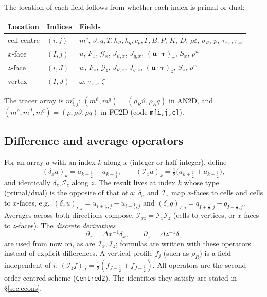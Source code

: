 \documentclass[11pt,a4paper]{article}
\newcommand{\vt}{\vartheta}                    %
\newcommand{\hth}{{h_{\vartheta}}}               %
\newcommand{\hq}{{h_q}}                          %
\newcommand{\bu}{\mathbf{u}}
\newcommand{\btau}{\boldsymbol{\tau}}
\newcommand{\code}[1]{\texttt{#1}}
\newcommand{\dx}{\delta_x}
\newcommand{\dz}{\delta_z}
\newcommand{\Ix}{\mathcal{I}_x}
\newcommand{\Iz}{\mathcal{I}_z}
\newcommand{\Ixz}{\mathcal{I}_{xz}}
\begin{document}
The location of each field follows from whether each index is primal or dual:
\begin{center}\small
\begin{tabular}{lll}
\hline
Location & Indices & Fields \\ \hline
cell centre & $(i,j)$ & $m^c$, $\vt,q,T,\hth,\hq,c_p,\Gamma,B,P$, $K$, $D$, $\rho\varepsilon$, $\sigma_\vt$, $p$, $\tau_{xx},\tau_{zz}$ \\
$x$-face & $(I,j)$ & $u$, $F_x$, $\mathcal G_x$, $J_{\vt;x}$, $J_{q;x}$, $(\bu\!\cdot\!\btau)_x$, $S_x$, $\rho^u$ \\
$z$-face & $(i,J)$ & $w$, $F_z$, $\mathcal G_z$, $J_{\vt;z}$, $J_{q;z}$, $(\bu\!\cdot\!\btau)_z$, $S_z$, $\rho^w$ \\
vertex & $(I,J)$ & $\omega$, $\tau_{xz}$, $\zeta$ \\ \hline
\end{tabular}
\end{center}
The tracer array is $m^c_{i,j}$: $(m^\vt,m^q)=(\rho_R\vt,\rho_Rq)$ in AN2D, and $(m^\rho,m^\vt,m^q)=(\rho,\rho\vt,\rho q)$ in FC2D (code \code{m[i,j,c]}).

\subsection{Difference and average operators}\label{sec:ops}
For an array $a$ with an index $k$ along $x$ (integer or half-integer), define
\begin{equation}
  (\dx a)_{k}=a_{k+\frac12}-a_{k-\frac12},\qquad (\Ix a)_{k}=\tfrac12\big(a_{k+\frac12}+a_{k-\frac12}\big),
\end{equation}
and identically $\dz,\Iz$ along $z$. The result lives at index $k$ whose type (primal/dual) is the opposite of that of $a$: $\dx$ and $\Ix$ map $x$-faces to cells and cells to $x$-faces, e.g.\ $(\dx u)_{i,j}=u_{i+\frac12,j}-u_{i-\frac12,j}$ and
$(\dx q)_{I,j}=q_{I+\frac12,j}-q_{I-\frac12,j}$. Averages across both directions compose, $\Ixz=\Ix\Iz$ (cells to vertices, or $x$-faces to $z$-faces). The \emph{discrete derivatives}
\begin{equation}
  \partial_x=\Delta x^{-1}\dx,\qquad \partial_z=\Delta z^{-1}\dz
\end{equation}
are used from now on, as are $\Ix,\Iz$; formulas are written with these operators instead of explicit differences. A vertical profile $f_j$ (such as $\rho_R$) is a field independent of $i$: $(\Iz f)_J=\tfrac12(f_{J-\frac12}+f_{J+\frac12})$.
All operators are the second-order centred scheme (\code{Centred2}). The identities they satisfy are stated in \S\ref{sec:econs}.
\end{document}
